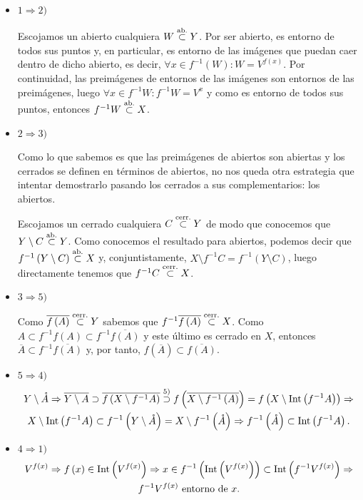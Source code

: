\begin{demo}
\begin{itemize}
    \item $1 \Rightarrow 2)$
    
    Escojamos un abierto cualquiera $W \stackrel{\text{ab.}}{\subset} Y$. Por ser abierto, es entorno de todos sus puntos y, en particular, es entorno de las imágenes que puedan caer dentro de dicho abierto, es decir, $\forall x \in f^{-1} (W) : W = V^{f(x)}$. Por continuidad, las preimágenes de entornos de las imágenes son entornos de las preimágenes, luego $\forall x \in f^{-1} W : f^{-1}W = V^x$ y como es entorno de todos sus puntos, entonces $f^{-1} W \stackrel{\text{ab.}}{\subset} X$.
    \item $2 \Rightarrow 3)$
    
    Como lo que sabemos es que las preimágenes de abiertos son abiertas y los cerrados se definen en términos de abiertos, no nos queda otra estrategia que intentar demostrarlo pasando los cerrados a sus complementarios: los abiertos.
    
    Escojamos un cerrado cualquiera $C \stackrel{\text{cerr.}}{\subset} Y$ de modo que conocemos que $Y \setminus C \stackrel{\text{ab.}}{\subset} Y$. Como conocemos el resultado para abiertos, podemos decir que $f^{-1}\left( Y\setminus C \right) \stackrel{\text{ab.}}{\subset} X$ y, conjuntistamente, $X \setminus f^{-1}C = f^{-1}\left( Y\setminus C \right)$, luego directamente tenemos que $f^{-1}C \stackrel{\text{cerr.}}{\subset} X$. 
    \item $3 \Rightarrow 5)$
    
    Como $\overline{f\left( A \right)} \stackrel{\text{cerr.}}{\subset} Y$ sabemos que $f^{-1}\overline{f\left( A \right)} \stackrel{\text{cerr.}}{\subset} X$. Como $A\subset f^{-1}f(A) \subset f^{-1}\overline{f\left( A \right)}$ y este último es cerrado en $X$, entonces $\overline{A}\subset f^{-1}\overline{f\left( A \right)}$ y, por tanto, $f\left( \overline{A} \right) \subset \overline{f\left( A \right)}$.
    \item $5 \Rightarrow 4)$
    \begin{gather*}
        Y \setminus \mathring{A}\Rightarrow \overline{Y\setminus A} \supset \overline{f\left( X \setminus f^{-1}A \right)} \stackrel{5)}{\supset} f\left( \overline{X \setminus f^{-1}\left( A \right)} \right) = f\left( X \setminus \operatorname{Int}\left( f^{-1}A \right) \right) \Rightarrow\\
        X \setminus \operatorname{Int}\left( f^{-1}A \right) \subset f^{-1}\left( Y\setminus \mathring{A} \right) = X \setminus f^{-1}\left( \mathring{A} \right)\Rightarrow f^{-1}\left( \mathring{A} \right) \subset \operatorname{Int}\left( f^{-1}A \right) 
    .\end{gather*}

    \item $4 \Rightarrow 1)$
    \begin{gather*}
        V^{f\left( x \right)} \Rightarrow f\left( x \right) \in \operatorname{Int}\left( V^{f\left( x \right)} \right) \Rightarrow x \in f^{-1}\left( \operatorname{Int}\left( V^{f\left( x \right)} \right) \right) \subset \operatorname{Int}\left( f^{-1}V^{f\left( x \right)} \right) \Rightarrow \\
        f^{-1}V^{f\left( x \right) } \text{ entorno de } x.
    \end{gather*}
\end{itemize}
\end{demo}

